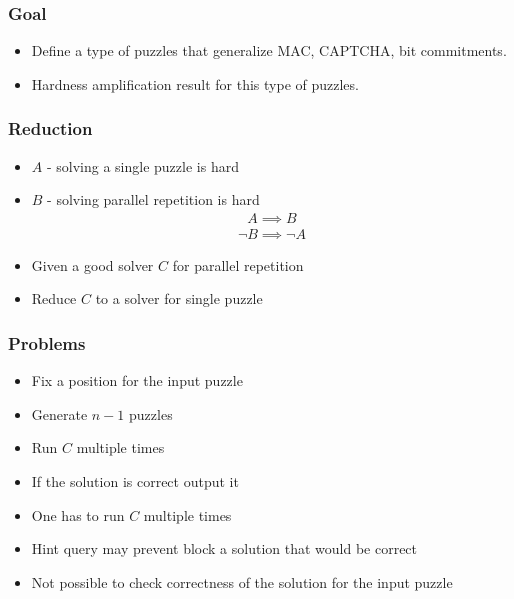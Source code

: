 \documentclass[first,firstsupp,handout,last]{ETHclass}
\begin{document}
\begin{frame}[t]
  \frametitle{Goal}
  \begin{itemize}
    \item Define a type of puzzles that generalize MAC, CAPTCHA, bit commitments.
    \item Hardness amplification result for this type of puzzles.
  \end{itemize}
  \vspace{40pt}
  \begin{figure}
    \centering
  \end{figure}
\end{frame}

\begin{frame}[t]
\frametitle{Reduction}
\begin{itemize}
  \item $A$ - solving a single puzzle is hard
  \item $B$ - solving parallel repetition is hard
    \begin{align*}
      A \implies B
    \end{align*}
      \begin{align*}
        \lnot B \implies \lnot A
      \end{align*}
  \item Given a good solver $C$ for parallel repetition
  \item Reduce $C$ to a solver for single puzzle
\end{itemize}
\end{frame}

\begin{frame}[t]
\frametitle{Problems}
\begin{itemize}
  \item Fix a position for the input puzzle
  \item Generate $n-1$ puzzles
  \item Run $C$ multiple times
  \item If the solution is correct output it
  \item One has to run $C$ multiple times
  \item Hint query may prevent block a solution that would be correct
  \item Not possible to check correctness of the solution for the input puzzle
\end{itemize}
\end{frame}
\end{document}
